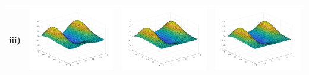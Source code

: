 \documentclass[11pt]{article}
\theoremstyle{definition}
\theoremstyle{remark}
\theoremstyle{plain}
\begin{document}
\begin{center}
\begin{tabular}{|>{\centering\arraybackslash}r|m{4.3cm}|m{4.3cm}|m{4.3cm}|}
    iii)&\includegraphics[width=\linewidth]{../Figures/poisson_rhs_3.png}&\includegraphics[width=\linewidth]{../Figures/poisson_actual_3.png}&\includegraphics[width=\linewidth]{../Figures/poisson_approx_3.png}\\\hline

\end{tabular}
\end{center}
\end{document}
